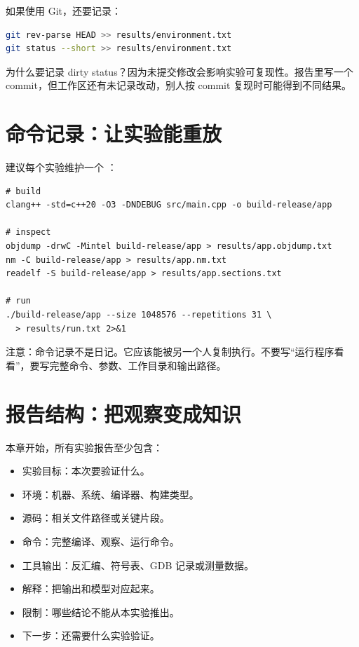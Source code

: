 如果使用 Git，还要记录：

\begin{lstlisting}[language=bash]
git rev-parse HEAD >> results/environment.txt
git status --short >> results/environment.txt
\end{lstlisting}

为什么要记录 dirty status？因为未提交修改会影响实验可复现性。报告里写一个 commit，但工作区还有未记录改动，别人按 commit 复现时可能得到不同结果。

\section{命令记录：让实验能重放}

建议每个实验维护一个 ：

\begin{lstlisting}
# build
clang++ -std=c++20 -O3 -DNDEBUG src/main.cpp -o build-release/app

# inspect
objdump -drwC -Mintel build-release/app > results/app.objdump.txt
nm -C build-release/app > results/app.nm.txt
readelf -S build-release/app > results/app.sections.txt

# run
./build-release/app --size 1048576 --repetitions 31 \
  > results/run.txt 2>&1
\end{lstlisting}

注意：命令记录不是日记。它应该能被另一个人复制执行。不要写“运行程序看看”，要写完整命令、参数、工作目录和输出路径。

\section{报告结构：把观察变成知识}

本章开始，所有实验报告至少包含：

\begin{itemize}
  \item 实验目标：本次要验证什么。
  \item 环境：机器、系统、编译器、构建类型。
  \item 源码：相关文件路径或关键片段。
  \item 命令：完整编译、观察、运行命令。
  \item 工具输出：反汇编、符号表、GDB 记录或测量数据。
  \item 解释：把输出和模型对应起来。
  \item 限制：哪些结论不能从本实验推出。
  \item 下一步：还需要什么实验验证。
\end{itemize}


